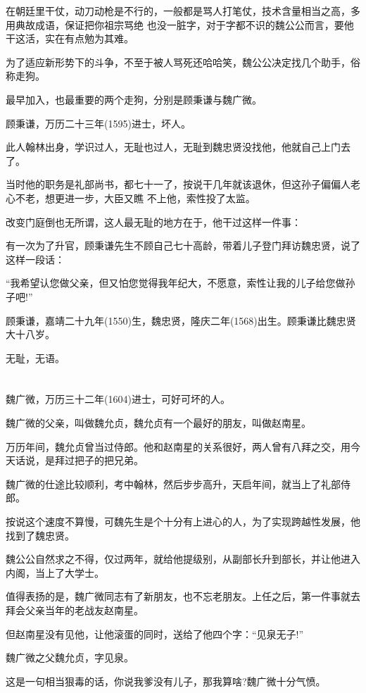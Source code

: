 \documentclass[11pt,a4paper,onecolumn]{article}
\begin{document}
在朝廷里干仗，动刀动枪是不行的，一般都是骂人打笔仗，技术含量相当之高，多用典故成语，保证把你祖宗骂绝
也没一脏字，对于字都不识的魏公公而言，要他干这活，实在有点勉为其难。

为了适应新形势下的斗争，不至于被人骂死还哈哈笑，魏公公决定找几个助手，俗称走狗。

最早加入，也最重要的两个走狗，分别是顾秉谦与魏广微。

顾秉谦，万历二十三年(1595)进士，坏人。

此人翰林出身，学识过人，无耻也过人，无耻到魏忠贤没找他，他就自己上门去了。

当时他的职务是礼部尚书，都七十一了，按说干几年就该退休，但这孙子偏偏人老心不老，想更进一步，大臣又瞧
不上他，索性投了太监。

改变门庭倒也无所谓，这人最无耻的地方在于，他干过这样一件事：

有一次为了升官，顾秉谦先生不顾自己七十高龄，带着儿子登门拜访魏忠贤，说了这样一段话：

``我希望认您做父亲，但又怕您觉得我年纪大，不愿意，索性让我的儿子给您做孙子吧!''

顾秉谦，嘉靖二十九年(1550)生，魏忠贤，隆庆二年(1568)出生。顾秉谦比魏忠贤大十八岁。

无耻，无语。

\section[\thesection]{}

魏广微，万历三十二年(1604)进士，可好可坏的人。

魏广微的父亲，叫做魏允贞，魏允贞有一个最好的朋友，叫做赵南星。

万历年间，魏允贞曾当过侍郎。他和赵南星的关系很好，两人曾有八拜之交，用今天话说，是拜过把子的把兄弟。

魏广微的仕途比较顺利，考中翰林，然后步步高升，天启年间，就当上了礼部侍郎。

按说这个速度不算慢，可魏先生是个十分有上进心的人，为了实现跨越性发展，他找到了魏忠贤。

魏公公自然求之不得，仅过两年，就给他提级别，从副部长升到部长，并让他进入内阁，当上了大学士。

值得表扬的是，魏广微同志有了新朋友，也不忘老朋友。上任之后，第一件事就去拜会父亲当年的老战友赵南星。

但赵南星没有见他，让他滚蛋的同时，送给了他四个字：``见泉无子!''

魏广微之父魏允贞，字见泉。

这是一句相当狠毒的话，你说我爹没有儿子，那我算啥?魏广微十分气愤。
\end{document}
